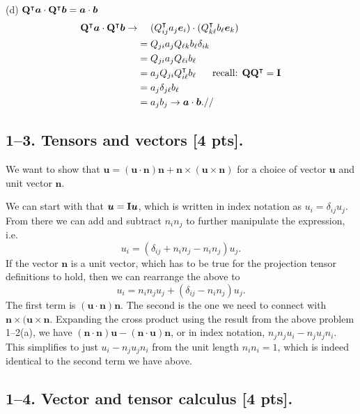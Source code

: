 \medskip
(d) $\mathbf{Q}^\intercal\bm{a} \cdot \mathbf{Q}^\intercal\bm{b} = \bm{a}\cdot\bm{b} $
\begin{align*}
   \mathbf{Q}^\intercal\bm{a} \cdot \mathbf{Q}^\intercal\bm{b} \rightarrow & ~~~~(Q^\intercal_{ij} a_j \bm{e}_i) \cdot (Q^\intercal_{k\ell} b_\ell \bm{e}_k) \\
    & = Q_{ji} a_j Q_{\ell k} b_\ell \delta_{ik}\\
    &= Q_{ji} a_j Q_{\ell i} b_\ell\\
    &= a_j Q_{ji} Q^\intercal_{i\ell} b_\ell ~~~~~\textrm{recall: }\mathbf{Q} \mathbf{Q}^\intercal = \mathbf{I}\\
    &= a_j \delta_{j\ell} b_\ell\\
    &= a_j b_j \rightarrow \bm{a} \cdot \bm{b}.//
\end{align*}

\bigskip
\subsection*{1--3. \textbf{Tensors and vectors} [4 pts].}

We want to show that $\bm{u} = (\bm{u} \cdot \bm{n}) \bm{n} + \bm{n} \times (\bm{u} \times \bm{n} )$ for a choice of vector $\bm{u}$ and unit vector $\bm{n}$. 

We can start with that $\bm{u} = \mathbf{I} \bm{u}$, which is written in index notation as $u_i = \delta_{ij} u_j$. 
From there we can add and subtract $n_i n_j$ to further manipulate the expression, i.e. 
\begin{equation*}
    u_i = (\delta_{ij} + n_i n_j - n_i n_j) u_j.
\end{equation*}
If the vector $\bm{n}$ is a unit vector, which has to be true for the projection tensor definitions to hold, then we can rearrange the above to
\begin{equation*}
    u_i = n_i n_j u_j + (\delta_{ij} - n_i n_j) u_j.
\end{equation*}
The first term is $(\bm{u}\cdot\bm{n})\bm{n}$. 
The second is the one we need to connect with $\bm{n} \times (\bm{u} \times \bm{n}$. 
Expanding the cross product using the result from the above problem 1--2(a), we have $(\bm{n} \cdot \bm{n})\bm{u} - (\bm{n}\cdot\bm{u})\bm{n}$, or in index notation, $n_j n_j u_i - n_j u_j n_i$. 
This simplifies to just $u_i - n_j u_j n_i$ from the unit length $n_i n_i =1$, which is indeed identical to the second term we have above. 

\bigskip
\subsection*{1--4. \textbf{Vector and tensor calculus} [4 pts].}

